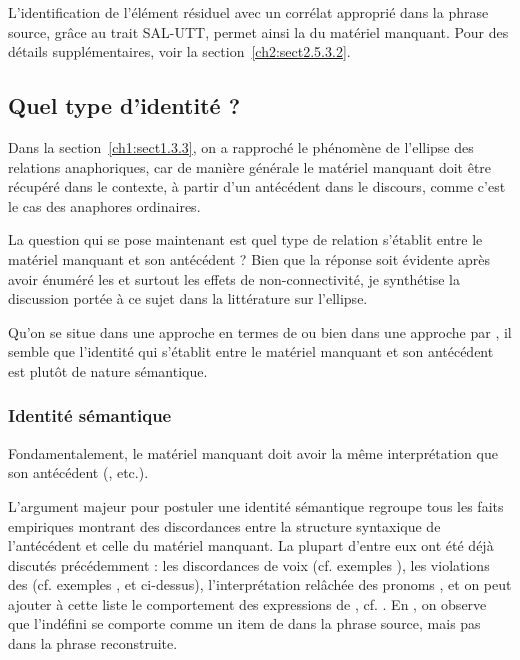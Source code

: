 L’identification de l’élément résiduel avec un corrélat approprié dans la phrase source, grâce au trait SAL-UTT, permet ainsi la  du matériel manquant. Pour des détails supplémentaires, voir la section~\ref{ch2:sect2.5.3.2}.


\subsection{Quel type d’identité ?} \label{ch1:sect1.5.3}

Dans la section~\ref{ch1:sect1.3.3}, on a rapproché le phénomène de l’ellipse des relations anaphoriques, car de manière générale le matériel manquant doit être récupéré dans le contexte, à partir d’un antécédent dans le discours, comme c’est le cas des anaphores ordinaires.

La question qui se pose maintenant est quel type de relation s’établit entre le matériel manquant et son antécédent ? Bien que la réponse soit évidente après avoir énuméré les  et surtout les effets de non-connectivité, je synthétise la discussion portée à ce sujet dans la littérature sur l’ellipse. 

Qu’on se situe dans une approche en termes de  ou bien dans une approche par , il semble que l’identité qui s’établit entre le matériel manquant et son antécédent est plutôt de nature sémantique. 

\subsubsection{Identité sémantique} 

Fondamentalement, le matériel manquant doit avoir la même interprétation que son antécédent (\citealt{DalrympleEtAl1991,Hardt1993,GinzburgEtAl2000,Merchant2001,CulicoverEtAl2005}, etc.). 

  
L’argument majeur pour postuler une identité sémantique regroupe tous les faits empiriques montrant des discordances entre la structure syntaxique de l’an\-técédent et celle du matériel manquant. La plupart d’entre eux ont été déjà discutés précédemment : les discordances de voix (cf. exemples ), les violations des  (cf. exemples ,  et  ci-dessus), l’interprétation relâchée des pronoms , et on peut ajouter à cette liste le comportement des expressions de , cf. \citet{Sag1976}. En , on observe que l’indéfini se comporte comme un item de  dans la phrase source, mais pas dans la phrase reconstruite. 

